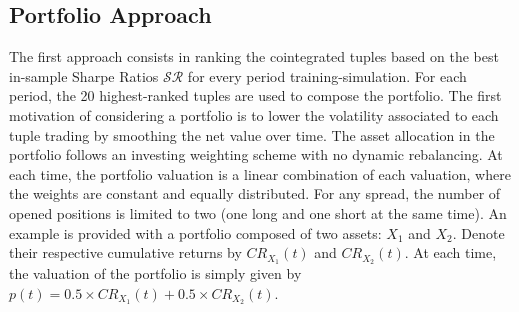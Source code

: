 \documentclass[11pt,a4,twosided,singlespacing,titlepagenumber=on]{scrreprt}
\numberwithin{equation}{chapter} %
\theoremstyle{remark}
\begin{document}
\subsection{Portfolio Approach}

The first approach consists in ranking the cointegrated tuples based on the best in-sample Sharpe Ratios $\mathcal{SR}$ for every period training-simulation. For each period, the 20 highest-ranked tuples are used to compose the portfolio. The first motivation of considering a portfolio is to lower the volatility associated to each tuple trading by smoothing the net value over time. The asset allocation in the portfolio follows an investing weighting scheme with no dynamic rebalancing. At each time, the portfolio valuation is a linear combination of each valuation, where the weights are constant and equally distributed. For any spread, the number of opened positions is limited to two (one long and one short at the same time). An example is provided with a portfolio composed of two assets: $X_1$ and $X_2$. Denote their respective cumulative returns by $CR_{X_1}(t)$ and $CR_{X_2}(t)$. At each time, the valuation of the portfolio is simply given by $p(t) = 0.5 \times CR_{X_1}(t) + 0.5 \times CR_{X_2}(t)$.
\end{document}
